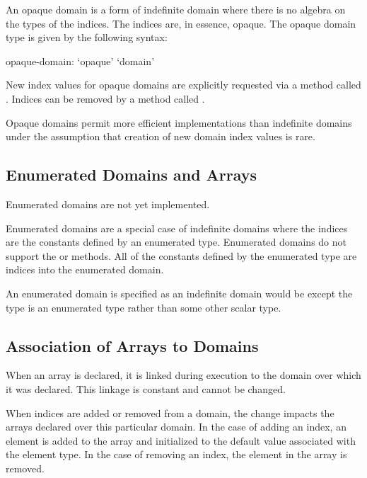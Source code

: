 An opaque domain is a form of indefinite domain where there is no
algebra on the types of the indices.  The indices are, in essence,
opaque.  The opaque domain type is given by the following syntax:
\begin{syntax}
opaque-domain:
  `opaque' `domain'
\end{syntax}

New index values for opaque domains are explicitly requested via a
method called .  Indices can be removed by a method
called .

Opaque domains permit more efficient implementations than indefinite
domains under the assumption that creation of new domain index values
is rare.

\subsection{Enumerated Domains and Arrays}
\label{Enumerated_Domains_and_Arrays}

\begin{status}
Enumerated domains are not yet implemented.
\end{status}

Enumerated domains are a special case of indefinite domains where the
indices are the constants defined by an enumerated type.  Enumerated
domains do not support the  or  methods.  All
of the constants defined by the enumerated type are indices into the
enumerated domain.

An enumerated domain is specified as an indefinite domain would be
except the type is an enumerated type rather than some other scalar
type.

\subsection{Association of Arrays to Domains}
\label{Association_of_Arrays_to_Domains}

When an array is declared, it is linked during execution to the domain
over which it was declared.  This linkage is constant and cannot be
changed.

When indices are added or removed from a domain, the change impacts
the arrays declared over this particular domain.  In the case of
adding an index, an element is added to the array and initialized to
the default value associated with the element type.  In the case of
removing an index, the element in the array is removed.

